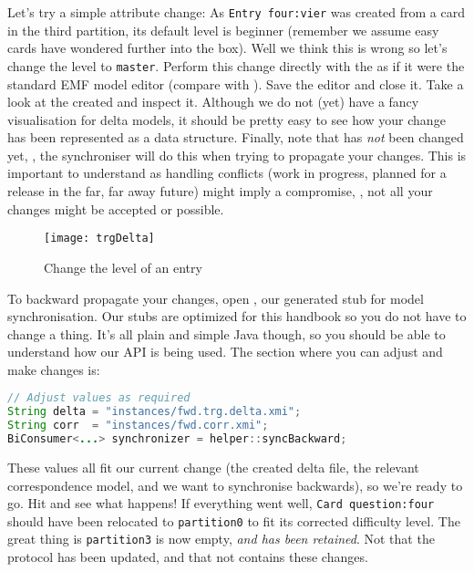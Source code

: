 \begin{stepbystep}
\item Let's try a simple attribute change:  As \texttt{Entry four:vier} was created from a card in the third partition, its default level is beginner (remember we assume easy cards have wondered further into the box).
Well we think this is wrong so let's change the level to \texttt{master}.
Perform this change directly with the  as if it were the standard EMF model editor (compare with ).
Save the editor and close it.
Take a look at the created  and inspect it.
Although we do not (yet) have a fancy visualisation for delta models, it should be pretty easy to see how your change has been represented as a data structure.
Finally, note that  has \emph{not} been changed yet, \idest, the synchroniser will do this when trying to propagate your changes.
This is important to understand as handling conflicts (work in progress, planned for a release in the far, far away future) might imply a compromise, \idest, not all your changes might be accepted or possible.

\begin{figure}[htbp]
\begin{center}
  \texttt{[image: trgDelta]}
  \caption{Change the level of an entry}
  \label{fig:trgDelta}
\end{center}
\end{figure}

\item To backward propagate your changes, open
, our generated stub for model synchronisation.
Our stubs are optimized for this handbook so you do not have to change a thing.
It's all plain and simple Java though, so you should be able to understand
how our API is being used.
The section where you can adjust and make changes is:
\begin{lstlisting}[language=Java]
// Adjust values as required
String delta = "instances/fwd.trg.delta.xmi";
String corr  = "instances/fwd.corr.xmi";
BiConsumer<...> synchronizer = helper::syncBackward;
\end{lstlisting}

These values all fit our current change (the created delta file, the relevant correspondence model, and we want to synchronise backwards), so we're ready to go.
Hit  and see what happens!
If everything went well, \texttt{Card question:four} should have been relocated to \texttt{partition0} to fit its corrected difficulty level.
The great thing is \texttt{partition3} is now empty, \emph{and has been retained}.
Not that the protocol has been updated, and that  not contains these changes.
\end{stepbystep}

